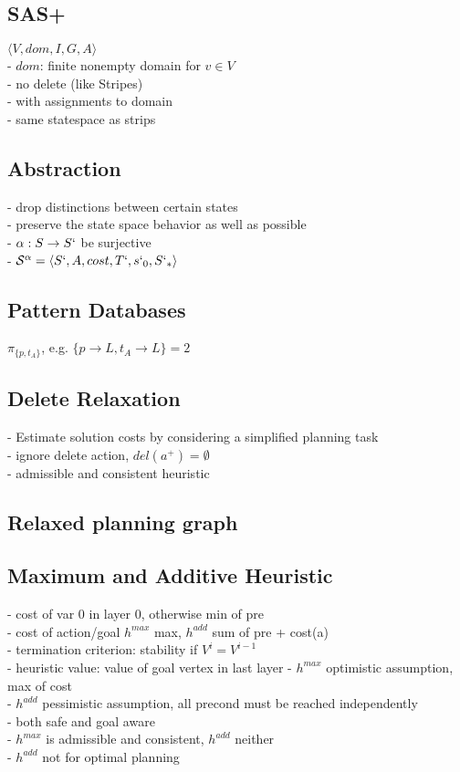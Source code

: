 \subsection*{SAS+}
$\langle V, dom, I, G, A \rangle$ \\
- $dom$: finite nonempty domain for $v \in V$ \\
- no delete (like Stripes) \\
- with assignments to domain \\
- same statespace as strips

\subsection*{Abstraction}
- drop distinctions between certain states\\
- preserve the state space behavior as well as possible \\
- $\alpha: S \rightarrow S`$ be surjective \\
- $\mathcal{S}^{\alpha} = \langle S`, A, cost, T`, s`_0, S`_*\rangle$

\subsection*{Pattern Databases}
$\pi_{\{p, t_A\}}$, e.g. $\{p \rightarrow L, t_A \rightarrow L\} = 2$

\subsection*{Delete Relaxation}
- Estimate solution costs by considering a simplified planning task \\
- ignore delete action,  $del(a^{+}) = \emptyset $ \\
- admissible and consistent heuristic

\subsection*{Relaxed planning graph}
\subsection*{Maximum and Additive Heuristic}
- cost of var 0 in layer 0, otherwise min of pre \\
- cost of action/goal $h^{max}$ max, $h^{add}$ sum of pre + cost(a) \\
- termination criterion: stability if $V^i = V^{i-1}$ \\
- heuristic value: value of goal vertex in last layer
- $h^{max}$ optimistic assumption, max of cost \\ 
- $h^{add}$ pessimistic assumption, all precond must be reached independently  \\
- both safe and goal aware \\
- $h^{max}$ is admissible and consistent, $h^{add}$ neither \\
- $h^{add}$ not for optimal planning

